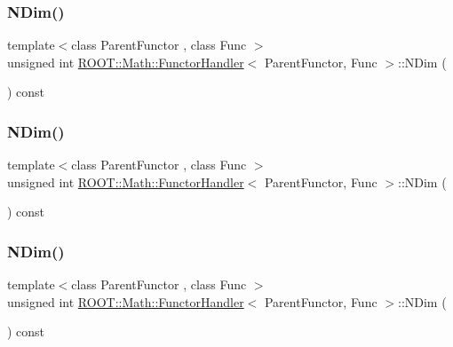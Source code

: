 \subsubsection{\texorpdfstring{NDim()}{NDim()}\hspace{0.1cm}{\footnotesize\ttfamily [1/3]}}
{\footnotesize\ttfamily template$<$class Parent\+Functor , class Func $>$ \\
unsigned int \mbox{\hyperlink{classROOT_1_1Math_1_1FunctorHandler}{R\+O\+O\+T\+::\+Math\+::\+Functor\+Handler}}$<$ Parent\+Functor, Func $>$\+::N\+Dim (\begin{DoxyParamCaption}{ }\end{DoxyParamCaption}) const\hspace{0.3cm}{\ttfamily [inline]}}

\mbox{\label{classROOT_1_1Math_1_1FunctorHandler_a448b3a68a8b9a55489a0b33b4cb26c93}} 
\subsubsection{\texorpdfstring{NDim()}{NDim()}\hspace{0.1cm}{\footnotesize\ttfamily [2/3]}}
{\footnotesize\ttfamily template$<$class Parent\+Functor , class Func $>$ \\
unsigned int \mbox{\hyperlink{classROOT_1_1Math_1_1FunctorHandler}{R\+O\+O\+T\+::\+Math\+::\+Functor\+Handler}}$<$ Parent\+Functor, Func $>$\+::N\+Dim (\begin{DoxyParamCaption}{ }\end{DoxyParamCaption}) const\hspace{0.3cm}{\ttfamily [inline]}}

\mbox{\label{classROOT_1_1Math_1_1FunctorHandler_a448b3a68a8b9a55489a0b33b4cb26c93}} 
\subsubsection{\texorpdfstring{NDim()}{NDim()}\hspace{0.1cm}{\footnotesize\ttfamily [3/3]}}
{\footnotesize\ttfamily template$<$class Parent\+Functor , class Func $>$ \\
unsigned int \mbox{\hyperlink{classROOT_1_1Math_1_1FunctorHandler}{R\+O\+O\+T\+::\+Math\+::\+Functor\+Handler}}$<$ Parent\+Functor, Func $>$\+::N\+Dim (\begin{DoxyParamCaption}{ }\end{DoxyParamCaption}) const\hspace{0.3cm}{\ttfamily [inline]}}



